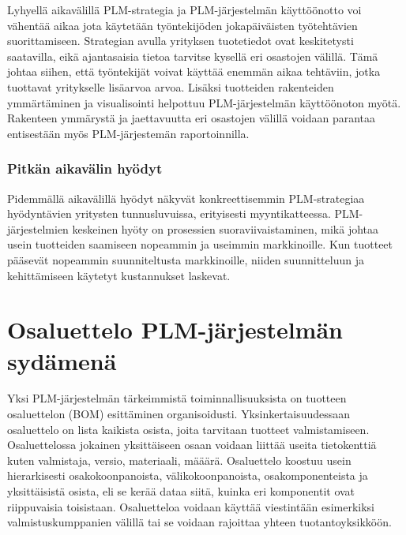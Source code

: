 Lyhyellä aikavälillä PLM-strategia ja PLM-järjestelmän käyttöönotto voi vähentää aikaa jota käytetään työntekijöden jokapäiväisten työtehtävien suorittamiseen. Strategian avulla yrityksen tuotetiedot ovat keskitetysti saatavilla, eikä ajantasaisia tietoa tarvitse kysellä eri osastojen välillä. Tämä johtaa siihen, että työntekijät voivat käyttää enemmän aikaa tehtäviin, jotka tuottavat yritykselle lisäarvoa arvoa. Lisäksi tuotteiden rakenteiden ymmärtäminen ja visualisointi helpottuu PLM-järjestelmän käyttöönoton myötä. Rakenteen ymmärystä ja jaettavuutta eri osastojen välillä voidaan parantaa entisestään myös PLM-järjestemän raportoinnilla. \cite{alemanni_key_2008}

\subsubsection{Pitkän aikavälin hyödyt} \label{Pitkän aikavälin hyödyt}

Pidemmällä aikavälillä hyödyt näkyvät konkreettisemmin PLM-strategiaa hyödyntävien yritysten tunnusluvuissa, erityisesti myyntikatteessa. PLM-järjestelmien keskeinen hyöty on prosessien suoraviivaistaminen, mikä johtaa usein tuotteiden saamiseen nopeammin ja useimmin markkinoille. Kun tuotteet pääsevät nopeammin suunniteltusta markkinoille, niiden suunnitteluun ja kehittämiseen käytetyt kustannukset laskevat. \cite{bouhaddou_plm_2012} \cite{alemanni_key_2008}


\section{Osaluettelo PLM-järjestelmän sydämenä} \label{Raportointi}

Yksi PLM-järjestelmän tärkeimmistä toiminnallisuuksista on tuotteen osaluettelon (BOM) esittäminen organisoidusti. \cite{david_what_2016} Yksinkertaisuudessaan osaluettelo on lista kaikista osista, joita tarvitaan tuotteet valmistamiseen. Osaluettelossa jokainen yksittäiseen osaan voidaan liittää useita tietokenttiä kuten valmistaja, versio, materiaali, määärä. Osaluettelo koostuu usein hierarkisesti osakokoonpanoista, välikokoonpanoista, osakomponenteista ja yksittäisistä osista, eli se kerää dataa siitä, kuinka eri komponentit ovat riippuvaisia toisistaan. Osaluetteloa voidaan käyttää viestintään esimerkiksi valmistuskumppanien välillä tai se voidaan rajoittaa yhteen tuotantoyksikköön.  \cite{jones_visualizing_2023}


